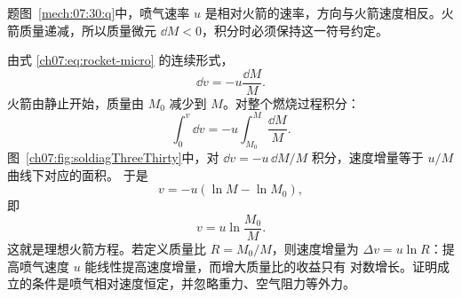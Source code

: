{\begin{origexamplebox}{}
\begin{qualityfigure}
\label{mech:07:30:q}
\end{qualityfigure}
\end{origexamplebox}

\begin{xesolution}题图~\ref{mech:07:30:q}中，喷气速率 $u$ 是相对火箭的速率，方向与火箭速度相反。火箭质量递减，所以质量微元 $\dd M<0$，积分时必须保持这一符号约定。

由式 \eqref{ch07:eq:rocket-micro} 的连续形式，
\[
 \dd v=-u\frac{\dd M}{M}.
\]
火箭由静止开始，质量由 $M_0$ 减少到 $M$。对整个燃烧过程积分：
\[
 \int_0^v\dd v
 =-u\int_{M_0}^{M}\frac{\dd M}{M}.
\]
图~\ref{ch07:fig:soldiagThreeThirty}中，对 $\dd v=-u\,\dd M/M$ 积分，速度增量等于 $u/M$ 曲线下对应的面积。
\soldiagThreeThirty
于是
\[
 v=-u\left(\ln M-\ln M_0\right),
\]
即
\[
 \boxed{v=u\ln\frac{M_0}{M}}.
\]
这就是理想火箭方程。若定义质量比 $R=M_0/M$，则速度增量为
$\Delta v=u\ln R$：提高喷气速度 $u$ 能线性提高速度增量，而增大质量比的收益只有
对数增长。证明成立的条件是喷气相对速度恒定，并忽略重力、空气阻力等外力。
\end{xesolution}
}

